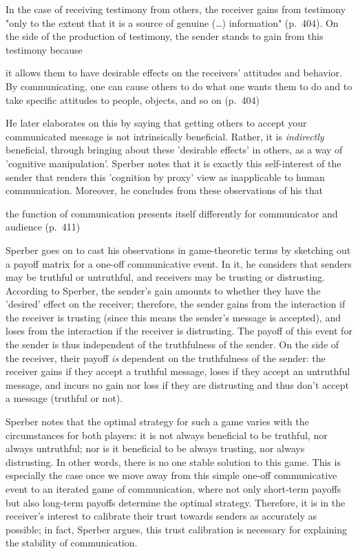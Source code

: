 In the case of receiving testimony from others, the receiver gains from testimony "only to the extent that it is a source of genuine (\ldots) information" (p.~404).
On the side of the production of testimony, the sender stands to gain from this testimony because
\begin{quoting}
    it allows them to have desirable effects on the receivers' attitudes and behavior. By communicating, one can cause others to do what one wants them to do and to take specific attitudes to people, objects, and so on
    \hfill (p.~404)
\end{quoting}
He later elaborates on this by saying that getting others to accept your communicated message is not intrinsically beneficial. Rather, it is \emph{indirectly} beneficial, through bringing about these 'desirable effects' in others, as a way of 'cognitive manipulation'.
Sperber notes that it is exactly this self-interest of the sender that renders this 'cognition by proxy' view as inapplicable to human communication.
Moreover, he concludes from these observations of his that
\begin{quoting}
    the function of communication presents itself differently for communicator and audience
    \hfill (p.~411)
\end{quoting}

Sperber goes on to cast his observations in game-theoretic terms by sketching out a payoff matrix for a one-off communicative event. In it, he considers that senders may be truthful or untruthful, and receivers may be trusting or distrusting. According to Sperber, the sender's gain amounts to whether they have the 'desired' effect on the receiver; therefore, the sender gains from the interaction if the receiver is trusting (since this means the sender's message is accepted), and loses from the interaction if the receiver is distrusting. The payoff of this event for the sender is thus independent of the truthfulness of the sender. On the side of the receiver, their payoff \emph{is} dependent on the truthfulness of the sender: the receiver gains if they accept a truthful message, loses if they accept an untruthful message, and incurs no gain nor loss if they are distrusting and thus don't accept a message (truthful or not).

Sperber notes that the optimal strategy for such a game varies with the circumstances for both players: it is not always beneficial to be truthful, nor always untruthful; nor is it beneficial to be always trusting, nor always distrusting. In other words, there is no one stable solution to this game.
This is especially the case once we move away from this simple one-off communicative event to an iterated game of communication, where not only short-term payoffs but also long-term payoffs determine the optimal strategy.
Therefore, it is in the receiver's interest to calibrate their trust towards senders as accurately as possible; in fact, Sperber argues, this trust calibration is necessary for explaining the stability of communication.

